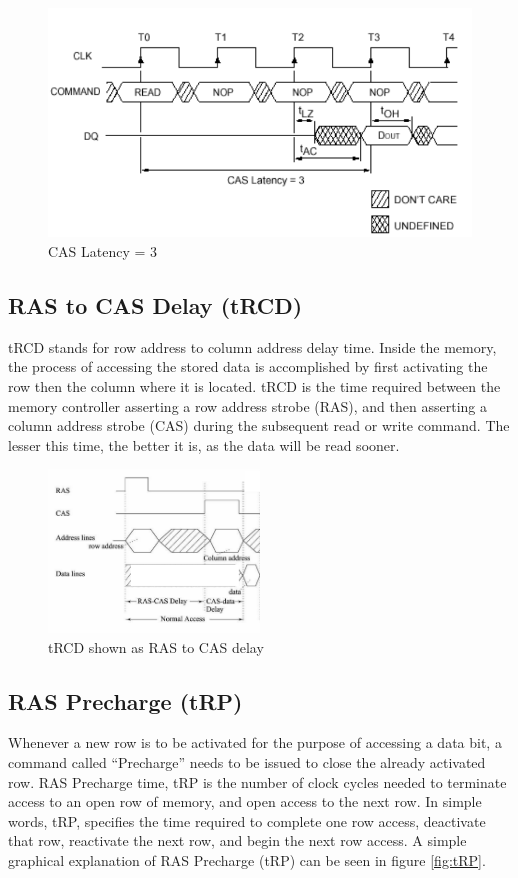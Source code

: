 \documentclass[12pt]{article}
\begin{document}
\begin{figure}[H]
	\centering
		\includegraphics[width=1\textwidth]{./images/CAS_Latency3.png}
	\caption{CAS Latency = 3}
	\label{fig:CAS_Latency3}
\end{figure}

\subsection{RAS to CAS Delay (tRCD)}
tRCD stands for row address to column address delay time. Inside the memory, the process of accessing the stored data is accomplished by first activating the row then the column where it is located. tRCD is the time required between the memory controller asserting a row address strobe (RAS), and then asserting a column address strobe (CAS) during the subsequent read or write command. The lesser this time, the better it is, as the data will be read sooner.

\begin{figure}[H]
	\centering
		\includegraphics[width=0.5\textwidth]{./images/tRCD.png}
	\caption{tRCD shown as RAS to CAS delay}
	\label{fig:tRCD}
\end{figure}

\subsection{RAS Precharge (tRP)}
Whenever a new row is to be activated for the purpose of accessing a data bit, a command called “Precharge” needs to be issued to close the already activated row. RAS Precharge time, tRP is the number of clock cycles needed to terminate access to an open row of memory, and open access to the next row.
In simple words, tRP, specifies the time required to complete one row access, deactivate that row, reactivate the next row, and begin the next row access.
A simple graphical explanation of RAS Precharge (tRP) can be seen in figure \ref{fig:tRP}.
\end{document}
